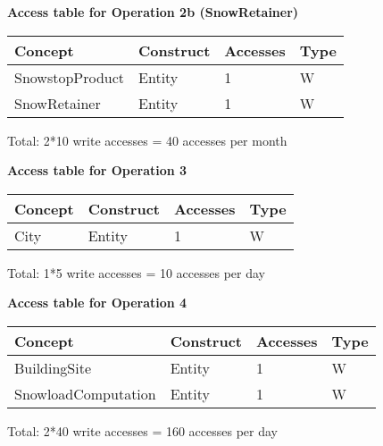 {\vspace{12px}

{\centering \textbf{Access table for Operation 2b (SnowRetainer)}\\}
\begin{table}[H]
  \def\arraystretch{1.10}%
  \centering
  \begin{tabular}{ | m{4cm} | m{4cm}| m{3cm} | m{2cm} |}
    \hline
    {\textbf{\large Concept}} & {\textbf{\large Construct}} & {\textbf{\large Accesses}} & {\textbf{\large Type}} \\
    \hline
    \color[HTML]{3531FF} SnowstopProduct & Entity & 1 & W \\
    \hline
    \color[HTML]{3531FF} SnowRetainer & Entity & 1 & W \\
    \hline
  \end{tabular}
\end{table}
Total: 2*10 write accesses = 40 accesses per month

\vspace{12px}

{\centering \textbf{Access table for Operation 3}\\}
\begin{table}[H]
  \def\arraystretch{1.10}%
  \centering
  \begin{tabular}{ | m{4cm} | m{4cm}| m{3cm} | m{2cm} |}
    \hline
    {\textbf{\large Concept}} & {\textbf{\large Construct}} & {\textbf{\large Accesses}} & {\textbf{\large Type}} \\
    \hline
    \color[HTML]{3531FF} City & Entity & 1 & W \\
    \hline
  \end{tabular}
\end{table}
Total: 1*5 write accesses = 10 accesses per day

\vspace{12px}

{\centering \textbf{Access table for Operation 4}\\}
\begin{table}[H]
  \def\arraystretch{1.10}%
  \centering
  \begin{tabular}{ | m{4cm} | m{4cm}| m{3cm} | m{2cm} |}
    \hline
    {\textbf{\large Concept}} & {\textbf{\large Construct}} & {\textbf{\large Accesses}} & {\textbf{\large Type}} \\
    \hline
    \color[HTML]{3531FF} BuildingSite & Entity & 1 & W \\
    \hline
    \color[HTML]{3531FF} SnowloadComputation & Entity & 1 & W \\
    \hline
  \end{tabular}
\end{table}
Total: 2*40 write accesses = 160 accesses per day

}
